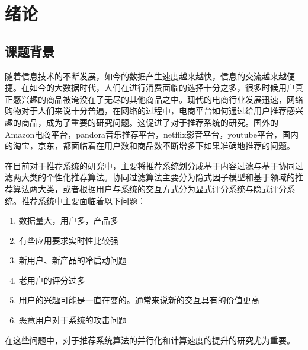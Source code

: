 \chapter{绪论}
%
%
%
%
%



\section{课题背景}
随着信息技术的不断发展，如今的数据产生速度越来越快，信息的交流越来越便捷。在如今的大数据时代，人们在进行消费面临的选择十分之多，很多时候用户真正感兴趣的商品被淹没在了无尽的其他商品之中。现代的电商行业发展迅速，网络购物对于人们来说十分普遍，在网络的过程中，电商平台如何通过给用户推荐感兴趣的商品，成为了重要的研究问题。这促进了对于推荐系统的研究。国外的Amazon电商平台\cite{Linden:2003kc}，pandora音乐推荐平台，netflix影音平台，youtube平台\cite{Davidson:2010hg}，国内的淘宝，京东，都面临着在用户数和商品数不断增多下如果准确地推荐的问题。

在目前对于推荐系统的研究中，主要将推荐系统划分成基于内容过滤与基于协同过滤两大类的个性化推荐算法。协同过滤算法主要分为隐式因子模型和基于领域的推荐算法两大类，或者根据用户与系统的交互方式分为显式评分系统与隐式评分系统。推荐系统中主要面临着以下问题：
\begin{enumerate}
    \item  数据量大，用户多，产品多
    \item 有些应用要求实时性比较强
    \item 新用户、新产品的冷启动问题
    \item 老用户的评分过多
    \item  用户的兴趣可能是一直在变的。通常来说新的交互具有的价值更高
    \item 恶意用户对于系统的攻击问题
 \end{enumerate}
 在这些问题中，对于推荐系统算法的并行化和计算速度的提升的研究尤为重要。
 
